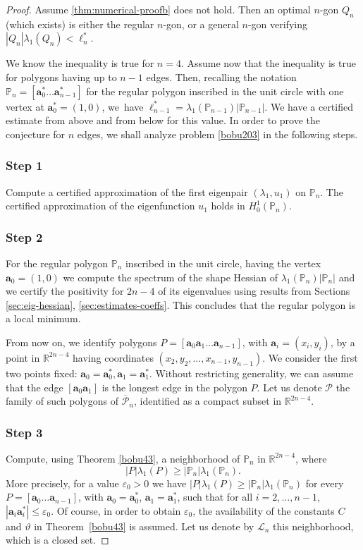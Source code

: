 \documentclass[JEP,XML,SOM,Unicode,ThmDefs,NoFloatCountersInSection,published]{cedram}
\theoremstyle{plain}
\theoremstyle{definition}
\newcommand{\bo}[1]{{\boldsymbol#1}}
\let\Bbb\mathbb
\def\R{\mathbb{R}}
\newcommand{\vps}{\varepsilon}
\newcommand{\lb}{\lambda}
\newcommand{\ov}{\overline}
\begin{document}
\begin{proof}
Assume \eqref{thm:numerical-proofb} does not hold. Then an optimal $n$-gon $Q_n$ (which exists) is either the regular $n$-gon, or a general $n$-gon verifying $|Q_n|\lambda_1(Q_n) < \ell_n^*$.

We know the inequality is true for $n=4$. Assume now that the inequality is true for polygons having up to $n-1$ edges. Then, recalling the notation $\Bbb{P}_n=[\bo a_0^*\dots\bo a_{n-1}^*]$ for the regular polygon inscribed in the unit circle with one vertex at $\bo a_0^*=(1,0)$, we~have $\ell_{n-1}^* = \lambda_1(\Bbb P_{n-1})|\Bbb P_{n-1}|$.
We have a certified estimate from above and from below for this value. In order to prove the conjecture for $n$ edges, we shall analyze problem \eqref{bobu203} in the following steps.

\subsubsection*{Step 1} Compute a certified approximation of the first eigenpair $(\lb_1, u_1)$ on $\Bbb P_{n}$. The certified approximation of the eigenfunction $u_1$ holds in $H^1_0(\Bbb P_n)$.

\subsubsection*{Step 2} For the regular polygon $\Bbb{P}_n$ inscribed in the unit circle, having the vertex $\bo a_0 = (1,0)$ we compute the spectrum of the shape Hessian of $\lambda_1(\Bbb P_n)|\Bbb P_n|$ and we certify the positivity for $2n-4$ of its eigenvalues using results from Sections \ref{sec:eig-hessian}, \ref{sec:estimates-coeffs}. This concludes that the regular polygon is a local minimum.

From now on, we identify polygons $P=[\bo a_0\bo a_1\dots \bo a_{n-1}]$, with $\bo a_i=(x_i,y_i)$, by a point in $ \R^{2n-4}$ having coordinates $(x_2,y_2, \dots, x_{n-1}, y_{n-1})$. We consider the first two points fixed: $\bo a_0=\bo a_0^*, \bo a_1=\bo a_1^*$. Without restricting generality, we can assume that the edge $[\bo a_0\bo a_1]$ is the longest edge in the polygon $P$. Let us denote $\mathcal P$ the family of such polygons of $\ov {\mathcal P}_n$, identified as a compact subset in $\R^{2n-4}$.

\subsubsection*{Step 3} Compute, using Theorem \ref{bobu43}, a neighborhood of $\Bbb P_{n}$ in $\R^{2n-4}$, where
\[
|P|\lb_1(P) \ge |\Bbb P_n|\lb_1(\Bbb P_n).
\]
More precisely, for a value $\vps_0>0$ we have $|P| \lb_1(P) \ge |\Bbb{P}_n| \lb_1(\Bbb P_n)$ for every $P=[\bo a_0\dots \bo a_{n-1}]$, with $\bo a_0=\bo a_0^*$, $\bo a_1=\bo a_1^*$, such that for all $i=2,\dots, n-1$, $ |\bo a_i\bo a_i^*| \le \vps _0$. Of course, in order to obtain $\vps_0$, the availability of the constants $C$ and $ \vartheta$ in Theorem~\ref{bobu43} is assumed. Let us denote by $\mathcal L_n$ this neighborhood, which is a closed set.


\end{proof}
\end{document}
